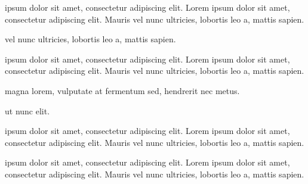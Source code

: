 
\begin{description}[leftmargin=0pt]
    \item[Lorem] ipsum dolor sit amet, consectetur adipiscing elit. Lorem ipsum dolor sit amet, consectetur adipiscing elit. Mauris vel nunc ultricies, lobortis leo a, mattis sapien.
    \item[Mauris] vel nunc ultricies, lobortis leo a, mattis sapien.
    \item[Duis] ipsum dolor sit amet, consectetur adipiscing elit. Lorem ipsum dolor sit amet, consectetur adipiscing elit.
    Mauris vel nunc ultricies, lobortis leo a, mattis sapien.
    \item[Etiam] magna lorem, vulputate at fermentum sed, hendrerit nec metus.
    \item[Integer] ut nunc elit.
    \item[Cras] ipsum dolor sit amet, consectetur adipiscing elit. Lorem ipsum dolor sit amet, consectetur adipiscing elit. Mauris vel nunc ultricies, lobortis leo a, mattis sapien.
    \item[Aliquam] ipsum dolor sit amet, consectetur adipiscing elit. Lorem ipsum dolor sit amet, consectetur adipiscing elit. Mauris vel nunc ultricies, lobortis leo a, mattis sapien.
\end{description}